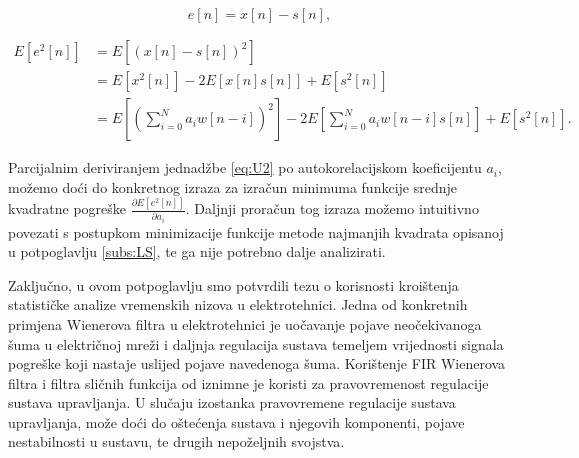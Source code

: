\documentclass[a4paper,12pt,oneside]{memoir}
\begin{document}
                \begin{equation}
                    e[n]=x[n]-s[n],
                \end{equation}
            
                \begin{equation}
                    \begin{split}
                        E\left[e^2[n]\right]&=E\left[\left(x[n]-s[n]\right)^2\right] \\
                        & = E\left[x^2[n]\right]-2E\left[x[n]s[n]\right]+E\left[s^2[n]\right] \\
                        & = E\left[\left(\displaystyle\sum_{i=0}^{N}a_i w[n-i]\right)^2\right]-2E\left[\displaystyle\sum_{i=0}^{N}a_i w[n-i]s[n]\right]+E\left[s^2[n]\right].
                    \end{split}
                    \label{eq:U2}
                \end{equation}

                Parcijalnim deriviranjem jednadžbe \eqref{eq:U2} po autokorelacijskom koeficijentu $a_i$, možemo doći do konkretnog izraza za izračun minimuma funkcije srednje kvadratne pogreške $\frac{\partial E[e^2[n]]}{\partial a_i}$. Daljnji proračun tog izraza možemo intuitivno povezati s postupkom minimizacije funkcije metode najmanjih kvadrata opisanoj u potpoglavlju \ref{subs:LS}, te ga nije potrebno dalje analizirati.
                
                Zaključno, u ovom potpoglavlju smo potvrdili tezu o korisnosti kroištenja statističke analize vremenskih nizova u elektrotehnici. Jedna od konkretnih primjena Wienerova filtra u elektrotehnici je uočavanje pojave neočekivanoga šuma u električnoj mreži i daljnja regulacija sustava temeljem vrijednosti signala pogreške koji nastaje uslijed pojave navedenoga šuma. Korištenje FIR Wienerova filtra i filtra sličnih funkcija od iznimne je koristi za pravovremenost regulacije sustava upravljanja. U slučaju izostanka pravovremene regulacije sustava upravljanja, može doći do oštećenja sustava i njegovih komponenti, pojave nestabilnosti u sustavu, te drugih nepoželjnih svojstva.

\end{document}

